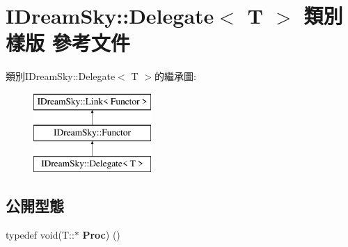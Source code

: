 \hypertarget{class_i_dream_sky_1_1_delegate}{}\section{I\+Dream\+Sky\+:\+:Delegate$<$ T $>$ 類別 樣版 參考文件}
\label{class_i_dream_sky_1_1_delegate}
類別\+I\+Dream\+Sky\+:\+:Delegate$<$ T $>$的繼承圖\+:\begin{figure}[H]
\begin{center}
\leavevmode
\includegraphics[height=3.000000cm]{class_i_dream_sky_1_1_delegate}
\end{center}
\end{figure}
\subsection*{公開型態}
\begin{DoxyCompactItemize}
\item 
typedef void(T\+::$\ast$ {\bfseries Proc}) ()\hypertarget{class_i_dream_sky_1_1_delegate_a3660bbe86e69ab1494d6a9d57e1adc27}{}\label{class_i_dream_sky_1_1_delegate_a3660bbe86e69ab1494d6a9d57e1adc27}

\end{DoxyCompactItemize}
